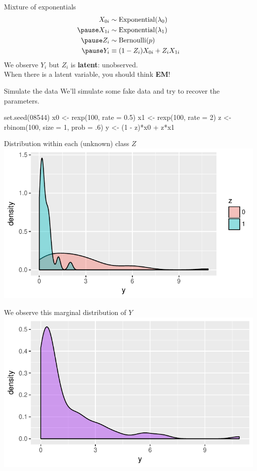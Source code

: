 \documentclass{beamer}
\newcommand\blue[1]{{\color{blue}#1}}
\newcommand\bblue[1]{{\color{blue}\textbf{#1}}}
\newcommand\bgreen[1]{{\color{olive}\textbf{#1}}}
\begin{document}
\begin{frame}{Mixture of exponentials}
\centering
$$\begin{aligned}
X_{0i}&\sim \text{Exponential}(\lambda_0) \\ \pause
X_{1i}&\sim \text{Exponential}(\lambda_1) \\ \pause
Z_i &\sim \text{Bernoulli}(p) \\ \pause
Y_i &\equiv (1 - Z_i)X_{0i} + Z_iX_{1i}
\end{aligned}$$
We observe $Y_i$ but $Z_i$ is \bblue{latent}: unobserved. \\
When there is a latent variable, you should think \bgreen{EM}!
\end{frame}

\begin{frame}[fragile]{Simulate the data}
We'll simulate some fake data and try to recover the parameters.
\begin{semiverbatim}
set.seed(08544) \pause
x0 <- rexp(100, rate = 0.5) \pause
x1 <- rexp(100, rate = 2) \pause
z <- rbinom(100, size = 1, prob = .6) \pause
y <- (1 - z)*x0 + z*x1
\end{semiverbatim}
\end{frame}

\begin{frame}{Distribution within each (unknown) class $Z$}
\centering\includegraphics[width = .8\textwidth]{figs/expoMixture1.pdf}
\end{frame}

\begin{frame}{We observe this \blue{marginal} distribution of $Y$}
\centering\includegraphics[width = .8\textwidth]{figs/expoMixture2.pdf}
\end{frame}
\end{document}
